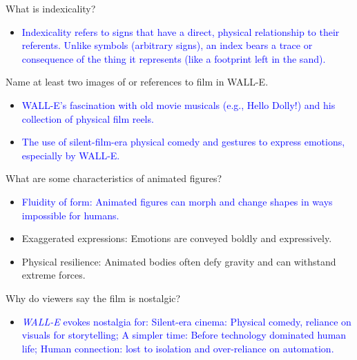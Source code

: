 \documentclass[11pt,fleqn]{book}
\begin{document}
\begin{exercise}
What is indexicality?
\begin{itemize}
\item \textcolor{blue}{Indexicality refers to signs that have a direct, physical relationship to their referents. Unlike symbols (arbitrary signs), an index bears a trace or consequence of the thing it represents (like a footprint left in the sand).}
\end{itemize}
\end{exercise}

\begin{exercise}
Name at least two images of or references to film in WALL-E.
\begin{itemize}
\item \textcolor{blue}{WALL-E's fascination with old movie musicals (e.g., Hello Dolly!) and his collection of physical film reels.}
\item \textcolor{blue}{The use of silent-film-era physical comedy and gestures to express  emotions, especially by WALL-E.}
\end{itemize}
\end{exercise}

\begin{exercise}
What are some characteristics of animated figures?
\begin{itemize}
\item \textcolor{blue}{Fluidity of form: Animated figures can morph and change shapes in ways impossible for humans.}
\item Exaggerated expressions: Emotions are conveyed boldly and expressively.
\item Physical resilience: Animated bodies often defy gravity and can withstand extreme forces.
\end{itemize}

\end{exercise}

\begin{exercise}
Why do viewers say the film is nostalgic?
\begin{itemize}
 \item \textcolor{blue}{ \textit{WALL-E} evokes nostalgia for:
Silent-era cinema: Physical comedy, reliance on visuals for storytelling; A simpler time:  Before technology dominated human life; Human connection: lost to isolation and over-reliance on automation.}
\end{itemize}
\end{exercise}
\end{document}
